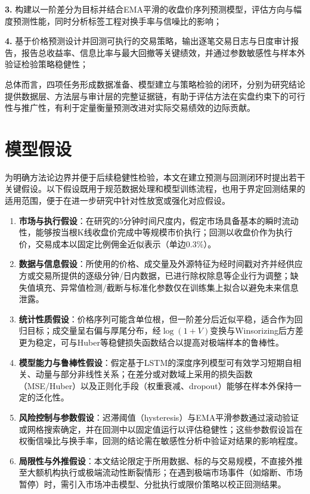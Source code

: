 \documentclass[withoutpreface,bwprint]{cumcmthesis}
\begin{document}
\textbf{3.} 构建以一阶差分为目标并结合EMA平滑的收盘价序列预测模型，评估方向与幅度预测性能，同时分析标签工程对换手率与信噪比的影响；

\textbf{4.} 基于价格预测设计并回测可执行的交易策略，输出逐笔交易日志与日度审计报告，报告总收益率、信息比率与最大回撤等关键绩效，并通过参数敏感性与样本外验证检验策略稳健性；

总体而言，四项任务形成数据准备、模型建立与策略检验的闭环，分别为研究结论提供数据层、方法层与审计层的完整证据链，有助于评估方法在实盘约束下的可行性与推广性，有利于定量衡量预测改进对实际交易绩效的边际贡献。

\newpage
\section{模型假设}

为明确方法论边界并便于后续稳健性检验，本文在建立预测与回测闭环时提出若干关键假设。以下假设既用于规范数据处理和模型训练流程，也用于界定回测结果的适用范围，便于在进一步研究中针对性放宽或强化对应假设。
\begin{enumerate}
    \item \textbf{市场与执行假设}：在研究的5分钟时间尺度内，假定市场具备基本的瞬时流动性，能够按当根K线收盘价完成中等规模市价执行；回测以收盘价作为执行价，交易成本以固定比例佣金近似表示（单边0.3\%）。
    \item \textbf{数据与信息假设}：所使用的价格、成交量及外源特征为经时间戳对齐并经供应方或交易所提供的逐级分钟/日内数据，已进行除权除息等企业行为调整；缺失值填充、异常值检测/截断与标准化参数仅在训练集上拟合以避免未来信息泄露。
    \item \textbf{统计性质假设}：价格序列可能含单位根，但一阶差分后近似平稳，适合作为回归目标；成交量呈右偏与厚尾分布，经$\log(1+V)$变换与Winsorizing后方差更为稳定，可与Huber等稳健损失函数结合以提高对极端样本的鲁棒性。
    \item \textbf{模型能力与鲁棒性假设}：假定基于LSTM的深度序列模型可有效学习短期自相关、动量与部分非线性关系；在差分或对数域上采用的损失函数（MSE/Huber）以及正则化手段（权重衰减、dropout）能够在样本外保持一定的泛化性。
    \item \textbf{风险控制与参数假设}：迟滞阈值（hysteresis）与EMA平滑参数通过滚动验证或网格搜索确定，并在回测中以固定值运行以评估稳健性；这些参数假设旨在权衡信噪比与换手率，回测的结论需在敏感性分析中验证对结果的影响程度。
    \item \textbf{局限性与外推假设}：本文结论限定于所用数据、标的与交易规模，不直接外推至大额机构执行或极端流动性断裂情形；在遇到极端市场事件（如熔断、市场暂停）时，需引入市场冲击模型、分批执行或限价策略以校正回测结果。
\end{enumerate}
\end{document}
